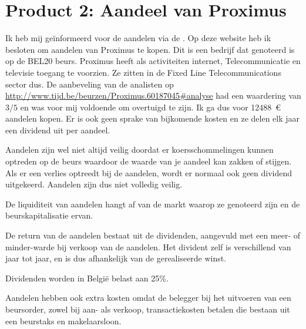 \section{Product 2: Aandeel van Proximus }



Ik heb mij geïnformeerd voor de aandelen via de %
. Op deze website heb ik besloten om aandelen van Proximus te kopen. Dit is een bedrijf dat genoteerd is op de BEL20 beurs. Proximus heeft als activiteiten internet, Telecommunicatie en televisie toegang te voorzien. Ze zitten in de Fixed Line Telecommunications sector dus. De aanbeveling van de analisten op \url{http://www.tijd.be/beurzen/Proximus.60187045#analyse} had een waardering van $3/5$ en was voor mij voldoende om overtuigd te zijn. Ik ga dus voor 12488~\euro{} aandelen kopen. Er is ook geen sprake van bijkomende kosten en ze delen elk jaar een dividend uit per aandeel.

Aandelen zijn wel niet altijd veilig doordat er koersschommelingen kunnen optreden op de beurs waardoor de waarde van je aandeel kan zakken of stijgen. Als er een verlies optreedt bij de aandelen, wordt er normaal ook geen dividend uitgekeerd. Aandelen zijn dus niet volledig veilig.

De liquiditeit van aandelen hangt af van de markt waarop ze genoteerd zijn en de beurskapitalisatie ervan.

De return van de aandelen bestaat uit de dividenden, aangevuld met een meer- of minder-warde bij verkoop van de aandelen. Het divident zelf is verschillend van jaar tot jaar, en is dus afhankelijk van de gerealiseerde winst.

Dividenden worden in België belast aan 25\%.

Aandelen hebben ook extra kosten omdat de belegger bij het uitvoeren van een beursorder, zowel bij aan- als verkoop, transactiekosten betalen die bestaan uit een beurstaks en makelaarsloon.


